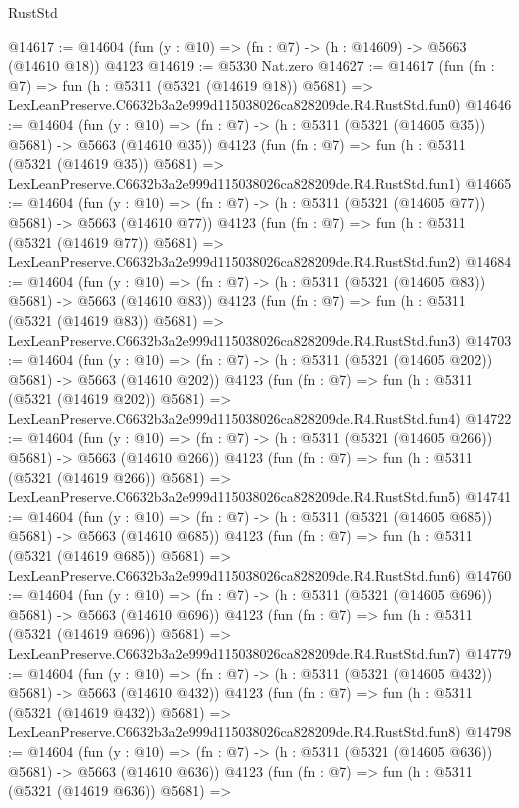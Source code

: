 \begin{lexlean}{RustStd}
\begin{coremodule}
@14617 := @14604 (fun (y : @10) => (fn : @7) -> (h : @14609) -> @5663 (@14610 @18)) @4123
@14619 := @5330 Nat.zero
@14627 := @14617
    (fun (fn : @7) =>
    fun (h : @5311 (@5321 (@14619 @18)) @5681) =>
    LexLeanPreserve.C6632b3a2e999d115038026ca828209de.R4.RustStd.fun0)
@14646 := @14604
    (fun (y : @10) => (fn : @7) -> (h : @5311 (@5321 (@14605 @35)) @5681) -> @5663 (@14610 @35))
    @4123
    (fun (fn : @7) =>
    fun (h : @5311 (@5321 (@14619 @35)) @5681) =>
    LexLeanPreserve.C6632b3a2e999d115038026ca828209de.R4.RustStd.fun1)
@14665 := @14604
    (fun (y : @10) => (fn : @7) -> (h : @5311 (@5321 (@14605 @77)) @5681) -> @5663 (@14610 @77))
    @4123
    (fun (fn : @7) =>
    fun (h : @5311 (@5321 (@14619 @77)) @5681) =>
    LexLeanPreserve.C6632b3a2e999d115038026ca828209de.R4.RustStd.fun2)
@14684 := @14604
    (fun (y : @10) => (fn : @7) -> (h : @5311 (@5321 (@14605 @83)) @5681) -> @5663 (@14610 @83))
    @4123
    (fun (fn : @7) =>
    fun (h : @5311 (@5321 (@14619 @83)) @5681) =>
    LexLeanPreserve.C6632b3a2e999d115038026ca828209de.R4.RustStd.fun3)
@14703 := @14604
    (fun (y : @10) => (fn : @7) -> (h : @5311 (@5321 (@14605 @202)) @5681) -> @5663 (@14610 @202))
    @4123
    (fun (fn : @7) =>
    fun (h : @5311 (@5321 (@14619 @202)) @5681) =>
    LexLeanPreserve.C6632b3a2e999d115038026ca828209de.R4.RustStd.fun4)
@14722 := @14604
    (fun (y : @10) => (fn : @7) -> (h : @5311 (@5321 (@14605 @266)) @5681) -> @5663 (@14610 @266))
    @4123
    (fun (fn : @7) =>
    fun (h : @5311 (@5321 (@14619 @266)) @5681) =>
    LexLeanPreserve.C6632b3a2e999d115038026ca828209de.R4.RustStd.fun5)
@14741 := @14604
    (fun (y : @10) => (fn : @7) -> (h : @5311 (@5321 (@14605 @685)) @5681) -> @5663 (@14610 @685))
    @4123
    (fun (fn : @7) =>
    fun (h : @5311 (@5321 (@14619 @685)) @5681) =>
    LexLeanPreserve.C6632b3a2e999d115038026ca828209de.R4.RustStd.fun6)
@14760 := @14604
    (fun (y : @10) => (fn : @7) -> (h : @5311 (@5321 (@14605 @696)) @5681) -> @5663 (@14610 @696))
    @4123
    (fun (fn : @7) =>
    fun (h : @5311 (@5321 (@14619 @696)) @5681) =>
    LexLeanPreserve.C6632b3a2e999d115038026ca828209de.R4.RustStd.fun7)
@14779 := @14604
    (fun (y : @10) => (fn : @7) -> (h : @5311 (@5321 (@14605 @432)) @5681) -> @5663 (@14610 @432))
    @4123
    (fun (fn : @7) =>
    fun (h : @5311 (@5321 (@14619 @432)) @5681) =>
    LexLeanPreserve.C6632b3a2e999d115038026ca828209de.R4.RustStd.fun8)
@14798 := @14604
    (fun (y : @10) => (fn : @7) -> (h : @5311 (@5321 (@14605 @636)) @5681) -> @5663 (@14610 @636))
    @4123
    (fun (fn : @7) =>
    fun (h : @5311 (@5321 (@14619 @636)) @5681) =>

\end{coremodule}
\end{lexlean}
